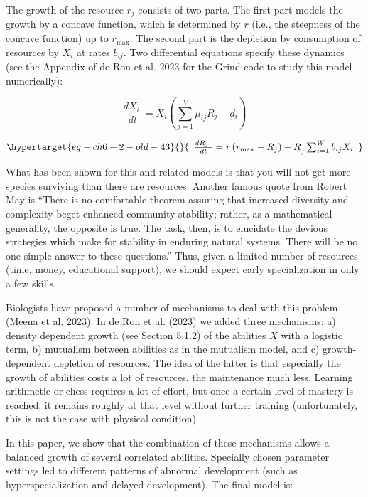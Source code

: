 \documentclass[
  letterpaper,
]{scrbook}
\begin{document}
The growth of the resource \(r_{j}\) consists of two parts. The first
part models the growth by a concave function, which is determined by
\(r\) (i.e., the steepness of the concave function) up to \(r_{\max}\).
The second part is the depletion by consumption of resources by
\(X_{i}\) at rates \(b_{ij}\). Two differential equations specify these
dynamics (see the Appendix of de Ron et al. 2023 for the Grind code to
study this model numerically):

\[\frac{dX_{i}\ }{dt} = X_{i}(\sum_{j = 1}^{V}{\mu_{ij}R_{j} - d_{i}})\]

\begin{equation}\protect\hypertarget{eq-ch6-2-old-43}{}{\begin{array}{r}
\frac{dR_{j}\ }{dt} = {r\left( r_{\max} - R_{j} \right) - R}_{j}\sum_{i = 1}^{W}{b_{ij}X_{i}}
\end{array}}\label{eq-ch6-2-old-43}\end{equation}

What has been shown for this and related models is that you will not get
more species surviving than there are resources. Another famous quote
from Robert May is ``There is no comfortable theorem assuring that
increased diversity and complexity beget enhanced community stability;
rather, as a mathematical generality, the opposite is true. The task,
then, is to elucidate the devious strategies which make for stability in
enduring natural systems. There will be no one simple answer to these
questions.'' Thus, given a limited number of resources (time, money,
educational support), we should expect early specialization in only a
few skills.

Biologists have proposed a number of mechanisms to deal with this
problem (Meena et al. 2023). In de Ron et al. (2023) we added three
mechanisms: a) density dependent growth (see Section 5.1.2) of the
abilities \(X\) with a logistic term, b) mutualism between abilities as
in the mutualism model, and c) growth-dependent depletion of resources.
The idea of the latter is that especially the growth of abilities costs
a lot of resources, the maintenance much less. Learning arithmetic or
chess requires a lot of effort, but once a certain level of mastery is
reached, it remains roughly at that level without further training
(unfortunately, this is not the case with physical condition).

In this paper, we show that the combination of these mechanisms allows a
balanced growth of several correlated abilities. Specially chosen
parameter settings led to different patterns of abnormal development
(such as hyperspecialization and delayed development). The final model
is:
\end{document}

